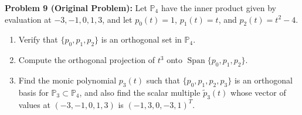 \documentclass[11pt, letterpaper]{article}
\theoremstyle{definition}
\theoremstyle{remark}
\begin{document}
\medskip

\textbf{Problem 9 (Original Problem):} Let $\mathbb{P}_4$ have the inner product given by evaluation at $-3, -1, 0, 1, 3$, and let $p_0(t) = 1$, $p_1(t) = t$, and $p_2(t) = t^2 - 4$.
\begin{enumerate}[label=(\alph*)]
    \item Verify that $\{p_0, p_1, p_2\}$ is an orthogonal set in $\mathbb{P}_4$.
    \item Compute the orthogonal projection of $t^3$ onto $\operatorname{Span}\{p_0, p_1, p_2\}$.
    \item Find the monic polynomial $p_3(t)$ such that $\{p_0, p_1, p_2, p_3\}$ is an orthogonal basis for $\mathbb{P}_3 \subset \mathbb{P}_4$, and also find the scalar multiple $\tilde{p}_3(t)$ whose vector of values at $(-3, -1, 0, 1, 3)$ is $(-1, 3, 0, -3, 1)^T$.
\end{enumerate}
\end{document}
